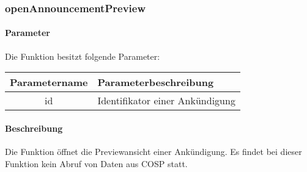 \subsubsection{openAnnouncementPreview}
\paragraph{Parameter} Die Funktion besitzt folgende Parameter:
\begin{table}[H]
	\begin{tabular}{|c|p{11cm}|}
		\hline
		\textbf{Parametername} & \textbf{Parameterbeschreibung} \\ \hline
		id    & Identifikator einer Ankündigung \\ \hline
	\end{tabular}
\end{table}
\paragraph{Beschreibung} Die Funktion öffnet die Previewansicht einer Ankündigung. Es findet bei dieser Funktion kein Abruf von Daten aus {\glqq COSP\grqq} statt.